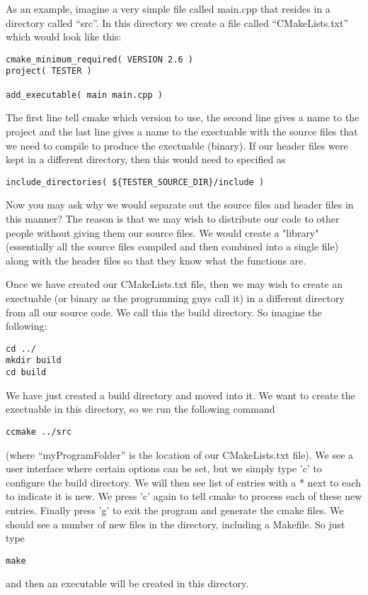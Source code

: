 \documentclass[a4paper, 10pt]{article}
\begin{document}
As an example, imagine a very simple file called main.cpp that resides
in a directory called ``src''. In this directory we create a file
called ``CMakeLists.txt'' which would look like this:
\begin{verbatim}
cmake_minimum_required( VERSION 2.6 )
project( TESTER )

add_executable( main main.cpp )
\end{verbatim}
The first line tell cmake which version to use, the second line gives
a name to the project and the last line gives a name to
the exectuable with the source files that we need to compile to
produce the exectuable (binary). If our header files were kept in a
different directory, then this would need to specified as
\begin{verbatim}
include_directories( ${TESTER_SOURCE_DIR}/include )
\end{verbatim}
Now you may ask why we would separate out the source files and header
files in this manner? The reason is that we may wish to distribute
our code  to other people without giving them our source files. We
would create a  "library" (essentially all the source files compiled
and then combined into a single file) along with the header files so
that they know what the functions are.

Once we have created our CMakeLists.txt file, then we may wish to
create an exectuable (or binary as the programming guys call it) in a
different directory from all our source code. We call this the build
directory. So imagine the following:
\begin{verbatim}
cd ../
mkdir build
cd build
\end{verbatim}
We have just created a build directory and moved into it. We want to
create the exectuable in this directory, so we run the following
command
\begin{verbatim}
ccmake ../src
\end{verbatim}
(where ``myProgramFolder'' is the location of our CMakeLists.txt
file). We see a user interface where certain options can be set, but
we simply type 'c' to configure the build directory. We will then see
list of entries with a * next to each to indicate it is new. We press
'c' again to tell cmake to process each of these new entries. Finally press 'g' to exit the
program and generate the cmake files. We should see a number of new files in the directory,
including a Makefile. So just type
\begin{verbatim}
make
\end{verbatim}
and then an executable will be created in this directory. 
\end{document}
